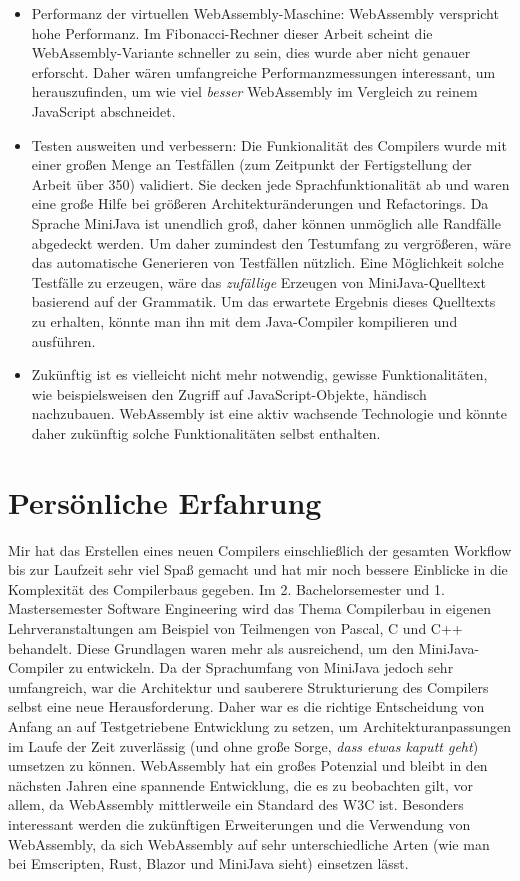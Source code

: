 \begin{itemize}
    \item Performanz der virtuellen WebAssembly-Maschine: WebAssembly verspricht hohe Performanz. Im Fibonacci-Rechner dieser Arbeit scheint die WebAssembly-Variante schneller zu sein, dies wurde aber nicht genauer erforscht. Daher wären umfangreiche Performanzmessungen interessant, um herauszufinden, um wie viel \emph{besser} WebAssembly im Vergleich zu reinem JavaScript abschneidet.
    \item Testen ausweiten und verbessern: Die Funkionalität des Compilers wurde mit einer großen Menge an Testfällen (zum Zeitpunkt der Fertigstellung der Arbeit über 350) validiert. Sie decken jede Sprachfunktionalität ab und waren eine große Hilfe bei größeren Architekturänderungen und Refactorings. Da Sprache MiniJava ist unendlich groß, daher können unmöglich alle Randfälle abgedeckt werden. Um daher zumindest den Testumfang zu vergrößeren, wäre das automatische Generieren von Testfällen nützlich. Eine Möglichkeit solche Testfälle zu erzeugen, wäre das \emph{zufällige} Erzeugen von MiniJava-Quelltext basierend auf der Grammatik. Um das erwartete Ergebnis dieses Quelltexts zu erhalten, könnte man ihn mit dem Java-Compiler kompilieren und ausführen.
    \item Zukünftig ist es vielleicht nicht mehr notwendig, gewisse Funktionalitäten, wie beispielsweisen den Zugriff auf JavaScript-Objekte, händisch nachzubauen. WebAssembly ist eine aktiv wachsende Technologie und könnte daher zukünftig solche Funktionalitäten selbst enthalten.
\end{itemize}

\section{Persönliche Erfahrung}

Mir hat das Erstellen eines neuen Compilers einschließlich der gesamten Workflow bis zur Laufzeit sehr viel Spaß gemacht und hat mir noch bessere Einblicke in die Komplexität des Compilerbaus gegeben. Im 2. Bachelorsemester und 1. Mastersemester Software Engineering wird das Thema Compilerbau in eigenen Lehrveranstaltungen am Beispiel von Teilmengen von Pascal, C und C++ behandelt. Diese Grundlagen waren mehr als ausreichend, um den MiniJava-Compiler zu entwickeln. Da der Sprachumfang von MiniJava jedoch sehr umfangreich, war die Architektur und sauberere Strukturierung des Compilers selbst eine neue Herausforderung. Daher war es die richtige Entscheidung von Anfang an auf Testgetriebene Entwicklung zu setzen, um Architekturanpassungen im Laufe der Zeit zuverlässig (und ohne große Sorge, \emph{dass etwas kaputt geht}) umsetzen zu können. WebAssembly hat ein großes Potenzial und bleibt in den nächsten Jahren eine spannende Entwicklung, die es zu beobachten gilt, vor allem, da WebAssembly mittlerweile ein Standard des W3C ist. Besonders interessant werden die zukünftigen Erweiterungen und die Verwendung von WebAssembly, da sich WebAssembly auf sehr unterschiedliche Arten (wie man bei Emscripten, Rust, Blazor und MiniJava sieht) einsetzen lässt.
